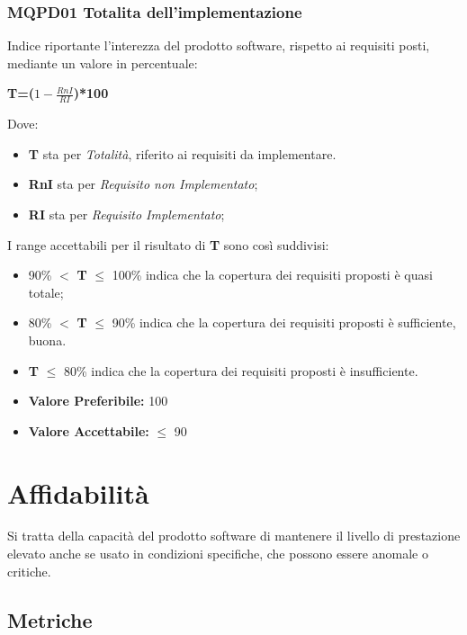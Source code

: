 \subsubsection{MQPD01 Totalita dell’implementazione} \label{3.1.1.1}
Indice riportante l’interezza del prodotto software, rispetto ai requisiti posti, mediante un valore in percentuale:
\begin{center}
	\textbf{T=($1-\frac{RnI}{RI}$)*100}
\end{center}
Dove:
\begin{itemize}
	\item \textbf{T} sta per \textit{Totalità}, riferito ai requisiti da implementare.
	\item \textbf{RnI} sta per \textit{Requisito non Implementato};
	\item \textbf{RI} sta per \textit{Requisito Implementato};
\end{itemize}
I range accettabili per il risultato di \textbf{T} sono così suddivisi:
\begin{itemize}
	\item 90\% $<$ \textbf{T} $\leq$ 100\% indica che la copertura dei requisiti proposti è quasi totale;
	\item 80\% $<$ \textbf{T} $\leq$ 90\% indica che la copertura dei requisiti proposti è sufficiente, buona.
	\item \textbf{T} $\leq$ 80\% indica che la copertura dei requisiti proposti è insufficiente.
\end{itemize}
\begin{itemize}
	\item \textbf{Valore Preferibile:} 100%
	\item \textbf{Valore  Accettabile:} $\leq$ 90%
\end{itemize}

\section{Affidabilità} \label{3.2}
Si tratta della capacità del prodotto software di mantenere il livello di prestazione elevato anche se usato in condizioni specifiche, che possono essere anomale o critiche. 
\subsection{Metriche} \label{3.2.1}

